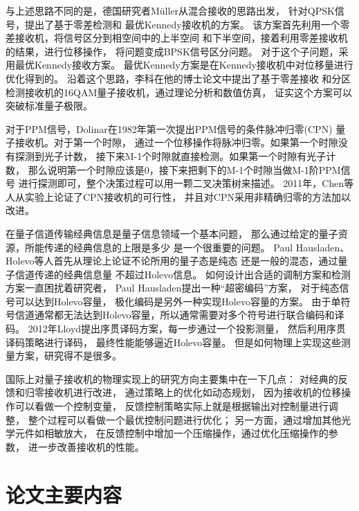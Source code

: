 与上述思路不同的是，德国研究者Müller从混合接收的思路出发，
针对QPSK信号，提出了基于零差检测和
最优Kennedy接收机的方案\cite{muller2012quadrature}。
该方案首先利用一个零差接收机，将信号区分到相空间中的上半空间
和下半空间，接着利用零差接收机的结果，进行位移操作，
将问题变成BPSK信号区分问题。
对于这个子问题，采用最优Kennedy接收方案。
最优Kennedy方案是在Kennedy接收机中对位移量进行优化得到的。
沿着这个思路，李科在他的博士论文中提出了基于零差接收
和分区检测接收机的16QAM量子接收机，通过理论分析和数值仿真，
证实这个方案可以突破标准量子极限\cite{李科2014}。

对于PPM信号，Dolinar在1982年第一次提出PPM信号的条件脉冲归零(CPN)
量子接收机\cite{dolinar1982near}。对于第一个时隙，
通过一个位移操作将脉冲归零。如果第一个时隙没有探测到光子计数，
接下来M-1个时隙就直接检测。如果第一个时隙有光子计数，
那么说明第一个时隙应该是0，接下来把剩下的M-1个时隙当做M-1阶PPM信号
进行探测即可，整个决策过程可以用一颗二叉决策树来描述。
2011年，Chen等人从实验上论证了CPN接收机的可行性，
并且对CPN采用非精确归零的方法加以改进\cite{chen2012optical}。

在量子信道传输经典信息是量子信息领域一个基本问题，
那么通过给定的量子资源，所能传递的经典信息的上限是多少
是一个很重要的问题。
Paul Hausladen、Holevo等人首先从理论上论证不论所用的量子态是纯态
还是一般的混态，通过量子信道传递的经典信息量
不超过Holevo信息\cite{hausladen1996classical,holevo1996capacity}。
如何设计出合适的调制方案和检测方案一直困扰着研究者，
Paul Hausladen提出一种“超密编码”方案\cite{hausladen1996classical}，
对于纯态信号可以达到Holevo容量，
极化编码是另外一种实现Holevo容量的方案\cite{wilde2013polar,guha2012polar}。
由于单符号信道通常都无法达到Holevo容量，所以通常需要对多个符号进行联合编码和译码。
2012年Lloyd提出序贯译码方案，每一步通过一个投影测量，
然后利用序贯译码策略进行译码，
最终性能能够逼近Holevo容量\cite{giovannetti2012achieving}。
但是如何物理上实现这些测量方案，研究得不是很多。

国际上对量子接收机的物理实现上的研究方向主要集中在一下几点：
对经典的反馈和归零接收机进行改进，
通过策略上的优化如动态规划\cite{dalla2014adaptive}，
因为接收机的位移操作可以看做一个控制变量，
反馈控制策略实际上就是根据输出对控制量进行调整，
整个过程可以看做一个最优控制问题进行优化；
另一方面，通过增加其他光学元件如相敏放大\cite{guha2011approaching}，
在反馈控制中增加一个压缩操作，通过优化压缩操作的参数，
进一步改善接收机的性能。




\section{论文主要内容}
